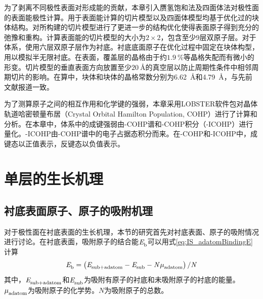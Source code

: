 为了剥离不同极性表面对形成能的贡献，本章引入赝氢饱和法及四面体法对极性面的表面能极性计算。用于表面能计算的切片模型以及四面体模型均基于优化过的块体结构。对所构建的切片模型进行了更进一步的结构优化使得表面原子得到充分的弛豫和重构。计算表面能的切片模型的大小为$2 \times 2$，包含至少9层双原子层。对于体系，使用六层双原子层作为衬底。衬底底面原子在优化过程中固定在块体构型，用以模拟半无限衬底。在表面，覆盖层的晶格由于约$\SI{1.9}{\percent}$等晶格失配而有微小的形变。切片模型的垂直表面方向放置至少$\SI{20}{\angstrom}$的真空层以防止周期性条件中相邻周期切片的影响。在算中，块体和块体的晶格常数分别为\SI{6.62}{\angstrom}和\SI{4.79}{\angstrom}，与先前文献报道一致。

为了测算原子之间的相互作用和化学键的强弱，本章采用LOBSTER软件包对晶体轨道哈密顿量布居（Crystal Orbital Hamilton Population, COHP）进行了计算和分析。在本章中，体系中的成键强弱由-COHP谱和-COHP积分（-ICOHP）进行量化。-ICOHP由-COHP谱中的电子占据态积分而来。在-COHP和-ICOHP中，成键态以正值表示，反键态以负值表示。

\section{单层的生长机理}

\subsection{衬底表面原子、原子的吸附机理}
\def\TfourSite{\rm T_{4} \it}
\def\HthreeSite{\rm H_{3} \it}
\def\mievpas{\milli\electronvolt\per\angstrom\squared}
\def\InSbMLpolar#1#2{\rm #1-In/#2-Sb}
\def\NumOfAdatom{\it N_{\rm adatoms} \it}
\def\CNinNsb#1#2#3#4{\rm #1/#2{}_{#3InV}^{#4SbT} \it}

对于极性面在衬底表面的生长机理，本节的研究首先对衬底表面、原子的吸附情况进行讨论。在衬底表面，吸附原子的结合能$\it E_{\rm b}^{\rm } \it$可以用式\eqref{eq:IS_adatomBindingE}计算\chinesecolon
\begin{equation}
    \label{eq:IS_adatomBindingE}
    \it E_{\rm b}^{\rm } \it=\left(\it E_{\rm sub+adatom}^{\rm } \it-\it E_{\rm sub}^{\rm } \it-N\it \mu_{\rm adatom}^{\rm } \it\right)/ N
\end{equation}
其中，$\it E_{\rm sub+adatom}^{\rm } \it$和$\it E_{\rm sub}^{\rm } \it$为吸附有原子的衬底和未吸附原子的衬底的能量。$\it \mu_{\rm adatom}^{\rm } \it$为吸附原子的化学势。$N$为吸附原子的总数。

